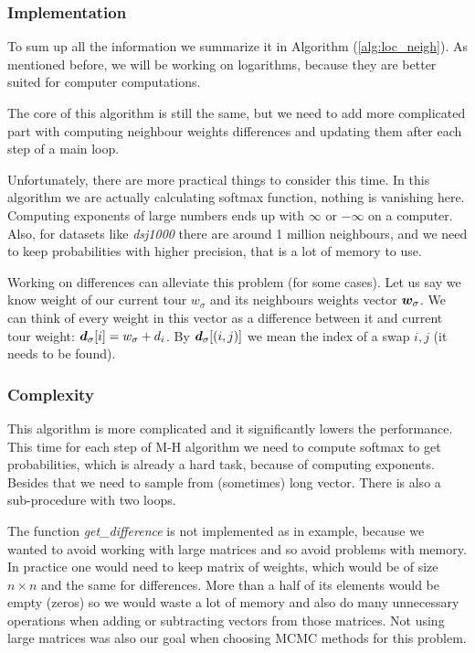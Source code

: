 	\subsubsection{Implementation}
	
		To sum up all the information we summarize it in Algorithm (\ref{alg:loc_neigh}). As mentioned before, we will be working on logarithms, because they are better suited for computer computations.

		The core of this algorithm is still the same, but we need to add more complicated part with computing neighbour weights differences and updating them after each step of a main loop.
		
		Unfortunately, there are more practical things to consider this time. In this algorithm we are actually calculating softmax function, nothing is vanishing here. Computing exponents of large numbers ends up with $\infty$ or $-\infty$ on a computer. Also, for datasets like \textit{dsj1000} there are around 1 million neighbours, and we need to keep probabilities with higher precision, that is a lot of memory to use.
		
		Working on differences can alleviate this problem (for some cases). Let us say we know weight of our current tour $w_\sigma$ and its neighbours weights vector $\bm{w}_\sigma$. We can think of every weight in this vector as a difference between it and current tour weight: $\bm{d}_{\sigma}[i] = w_\sigma + d_i$. By $\bm{d}_\sigma[(i,j)]$ we mean the index of a swap $i,j$ (it needs to be found).
		
		
		
	\subsubsection{Complexity}
		This algorithm is more complicated and it significantly lowers the performance. This time for each step of M-H algorithm we need to compute softmax to get probabilities, which is already a hard task, because of computing exponents. Besides that we need to sample from (sometimes) long vector. There is also a sub-procedure with two loops.
		
		The function \textit{get\_difference} is not implemented as in example, because we wanted to avoid working with large matrices and so avoid problems with memory. In practice one would need to keep matrix of weights, which would be of size $n \times n$ and the same for differences. More than a half of its elements would be empty (zeros) so we would waste a lot of memory and also do many unnecessary operations when adding or subtracting vectors from those matrices. Not using large matrices was also our goal when choosing MCMC methods for this problem.
		
